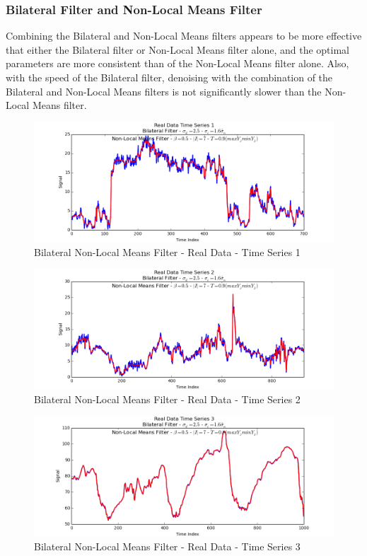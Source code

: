 \documentclass[11pt]{article}
\theoremstyle{definition}
\begin{document}
\newpage

\subsubsection{Bilateral Filter and Non-Local Means Filter}

Combining the Bilateral and Non-Local Means filters appears to be more effective that either the Bilateral filter or Non-Local Means filter alone, and the optimal parameters are more consistent than of the Non-Local Means filter alone. Also, with the speed of the Bilateral filter, denoising with the combination of the Bilateral and Non-Local Means filters is not significantly slower than the Non-Local Means filter.

\begin{figure}
\centering
\includegraphics[width = 0.75 \textwidth]{BilateralNLMeansRealSignal1.png}
\caption{Bilateral Non-Local Means Filter - Real Data - Time Series 1}
\label{bilateralmultinlmeansrealsignal1}
\end{figure}

\begin{figure}
\centering
\includegraphics[width = 0.75 \textwidth]{BilateralNLMeansRealSignal2.png}
\caption{Bilateral Non-Local Means Filter - Real Data - Time Series 2}
\label{bilateralmultinlmeansrealsignal2}
\end{figure}

\begin{figure}
\centering
\includegraphics[width = 0.75 \textwidth]{BilateralNLMeansRealSignal3.png}
\caption{Bilateral Non-Local Means Filter - Real Data - Time Series 3}
\label{bilateralmultinlmeansrealsignal3}
\end{figure}
\end{document}
